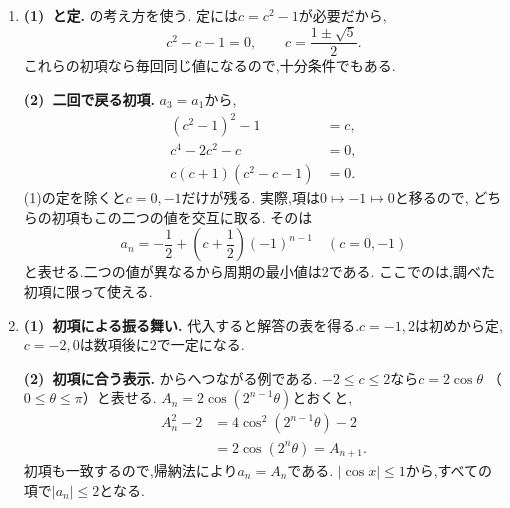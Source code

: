 \begin{enumerate}[label=\textbf{問\arabic*.},leftmargin=3.8em,format=\bookitemlink{practice-special}{solution}{problem}]
    \smallskip
    \textbf{(2)~二つの平方の比.}
    の$\sqrt2$を$\sqrt3$に置き換えた形である.
    \[
      a_{n+1}-\sqrt3=\frac{(a_n-\sqrt3)^2}{2a_n},
    \]
    \[
      a_{n+1}+\sqrt3=\frac{(a_n+\sqrt3)^2}{2a_n}.
    \]
    共通の分母を消すために比を取ると,
    \[
      b_{n+1}=b_n^2.
    \]
    初項は
    \[
      b_1=\frac{1-\sqrt3}{1+\sqrt3}=\sqrt3-2=q.
    \]
    $q<0$なので最初から実数のは使えない.二乗の繰り返しから帰納的に
    \[
      b_n=q^{\,2^{n-1}}
    \]
    が得られる.$b_n$の定義を$a_n$について解けば,
    \[
      a_n=\sqrt3\,\frac{1+b_n}{1-b_n}.
    \]
    $-1<q<0$なので$|b_n|<1$であり,
    分母$1-b_n$は常に正である.

    \smallskip
    \textbf{(3)~第2項以降の減少.}
    $n\ge2$では$b_n>0$なので,から$a_n>\sqrt3$である.
    また,
    \[
      a_{n+1}-a_n=\frac{3-a_n^2}{2a_n}<0
      \quad(n\ge2).
    \]
    $|q|<1$から$b_n\to0$であり,$a_n\to\sqrt3$となる.
    初項は収束先の下にあるが,第2項で上へ移ってから減少する.
    誤差を二乗する式も,この移動と速い収束を表す.
  \item \textbf{(1)~と定.}
    の考え方を使う.
    定には$c=c^2-1$が必要だから,
    \[
      c^2-c-1=0,\qquad c=\frac{1\pm\sqrt5}{2}.
    \]
    これらの初項なら毎回同じ値になるので,十分条件でもある.

    \smallskip
    \textbf{(2)~二回で戻る初項.}
    $a_3=a_1$から,
    \begin{align*}
      (c^2-1)^2-1&=c,\\
      c^4-2c^2-c&=0,\\
      c(c+1)(c^2-c-1)&=0.
    \end{align*}
    (1)の定を除くと$c=0,-1$だけが残る.
    実際,項は$0\mapsto-1\mapsto0$と移るので,
    どちらの初項もこの二つの値を交互に取る.
    そのは
    \[
      a_n=-\frac12+\left(c+\frac12\right)(-1)^{n-1}
      \quad(c=0,-1)
    \]
    と表せる.二つの値が異なるから周期の最小値は$2$である.
    ここでのは,調べた初項に限って使える.
  \item \textbf{(1)~初項による振る舞い.}
    代入すると解答の表を得る.$c=-1,2$は初めから定,$c=-2,0$は数項後に$2$で一定になる.

    \smallskip
    \textbf{(2)~初項に合う表示.}
    からへつながる例である.
    $-2\le c\le2$なら$c=2\cos\theta$
    （$0\le\theta\le\pi$）と表せる.
    $A_n=2\cos(2^{n-1}\theta)$とおくと,
    \begin{align*}
      A_n^2-2
      &=4\cos^2(2^{n-1}\theta)-2\\
      &=2\cos(2^n\theta)=A_{n+1}.
    \end{align*}
    初項も一致するので,帰納法により$a_n=A_n$である.
    $|\cos x|\le1$から,すべての項で$|a_n|\le2$となる.


\end{enumerate}
